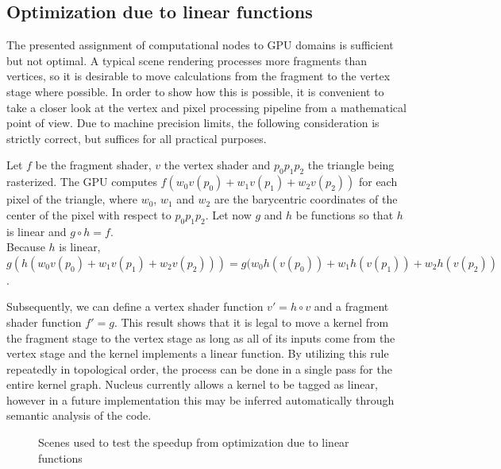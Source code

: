 \subsection{Optimization due to linear functions}

The presented assignment of computational nodes to GPU domains is sufficient but not optimal. A typical scene rendering processes more fragments than vertices, so it is desirable to move calculations from the fragment to the vertex stage where possible. In order to show how this is possible, it is convenient to take a closer look at the vertex and pixel processing pipeline from a mathematical point of view. Due to machine precision limits, the following consideration is strictly correct, but suffices for all practical purposes.

Let $f$ be the fragment shader, $v$ the vertex shader and $p_0 p_1 p_2$ the triangle being rasterized. The GPU computes $f(w_0 v(p_0) + w_1 v(p_1) + w_2 v(p_2))$ for each pixel of the triangle, where $w_0$, $w_1$ and $w_2$ are the barycentric coordinates of the center of the pixel with respect to $p_0 p_1 p_2$. Let now $g$ and $h$ be functions so that $h$ is linear and $g \circ h = f$. \\
Because $h$ is linear, \\
$g(h(w_0 v(p_0) + w_1 v(p_1) + w_2 v(p_2))) = g(w_0 h(v(p_0)) + w_1 h(v(p_1)) + w_2 h(v(p_2))$.

Subsequently, we can define a vertex shader function $v\prime = h \circ v$ and a fragment shader function $f\prime = g$. This result shows that it is legal to move a kernel from the fragment stage to the vertex stage as long as all of its inputs come from the vertex stage and the kernel implements a linear function. By utilizing this rule repeatedly in topological order, the process can be done in a single pass for the entire kernel graph. Nucleus currently allows a kernel to be tagged as linear, however in a future implementation this may be inferred automatically through semantic analysis of the code.

\begin{figure}[h!]
  \centering
  \caption{Scenes used to test the speedup from optimization due to linear functions}
  \label{fig:linFuncOpt}
\end{figure}

